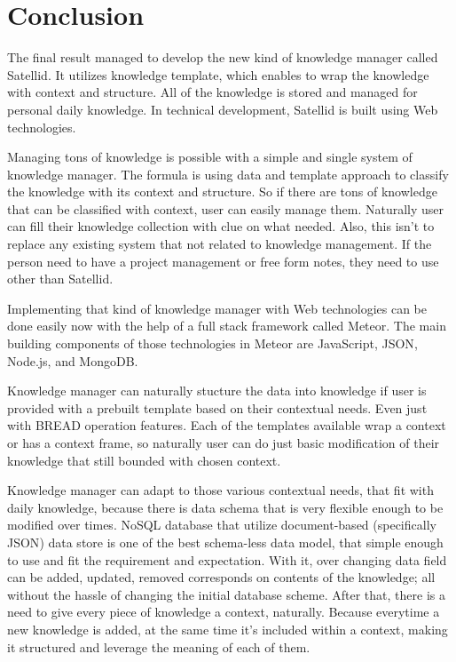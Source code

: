 \section{Conclusion}
\label{sec:conclusion}

The final result managed to develop the new kind of knowledge manager called Satellid.
It utilizes knowledge template, which enables to wrap the knowledge with context and structure.
All of the knowledge is stored and managed for personal daily knowledge.
In technical development, Satellid is built using Web technologies.

Managing tons of knowledge is possible with a simple and single system of knowledge manager.
The formula is using data and template approach to classify the knowledge with its context and structure.
So if there are tons of knowledge that can be classified with context, user can easily manage them.
Naturally user can fill their knowledge collection with clue on what needed.
Also, this isn't to replace any existing system that not related to knowledge management.
If the person need to have a project management or free form notes, they need to use other than Satellid.

Implementing that kind of knowledge manager with Web technologies can be done easily now with the help of a full stack framework called Meteor.
The main building components of those technologies in Meteor are JavaScript, \ac{JSON}, Node.js, and MongoDB.

Knowledge manager can naturally stucture the data into knowledge if user is provided with a prebuilt template based on their contextual needs.
Even just with \ac{BREAD} operation features.
Each of the templates available wrap a context or has a context frame, so naturally user can do just basic modification of their knowledge that still bounded with chosen context.

Knowledge manager can adapt to those various contextual needs, that fit with daily knowledge, because there is data schema that is very flexible enough to be modified over times.
\ac{NoSQL} database that utilize document-based (specifically \ac{JSON}) data store is one of the best schema-less data model, that simple enough to use and fit the requirement and expectation.
With it, over changing data field can be added, updated, removed corresponds on contents of the knowledge; all without the hassle of changing the initial database scheme.
After that, there is a need to give every piece of knowledge a context, naturally.
Because everytime a new knowledge is added, at the same time it's included within a context, making it structured and leverage the meaning of each of them.
